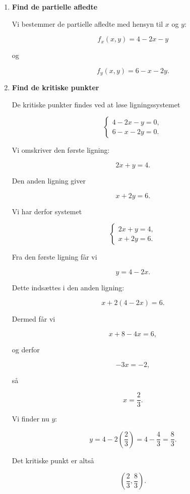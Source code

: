 \documentclass{article}
\begin{document}
\begin{enumerate}

    \item \textbf{Find de partielle afledte}

    Vi bestemmer de partielle afledte med hensyn til $x$ og $y$:

    \[
    f_x(x,y)=4-2x-y
    \]

    og

    \[
    f_y(x,y)=6-x-2y.
    \]

    \item \textbf{Find de kritiske punkter}

    De kritiske punkter findes ved at løse ligningssystemet

    \[
    \begin{cases}
    4-2x-y=0,\\
    6-x-2y=0.
    \end{cases}
    \]

    Vi omskriver den første ligning:

    \[
    2x+y=4.
    \]

    Den anden ligning giver

    \[
    x+2y=6.
    \]

    Vi har derfor systemet

    \[
    \begin{cases}
    2x+y=4,\\
    x+2y=6.
    \end{cases}
    \]

    Fra den første ligning får vi

    \[
    y=4-2x.
    \]

    Dette indsættes i den anden ligning:

    \[
    x+2(4-2x)=6.
    \]

    Dermed får vi

    \[
    x+8-4x=6,
    \]

    og derfor

    \[
    -3x=-2,
    \]

    så

    \[
    x=\frac{2}{3}.
    \]

    Vi finder nu $y$:

    \[
    y=4-2\left(\frac{2}{3}\right)
    =4-\frac{4}{3}
    =\frac{8}{3}.
    \]

    Det kritiske punkt er altså

    \[
    \boxed{\left(\frac{2}{3},\frac{8}{3}\right)}.
    \]


\end{enumerate}
\end{document}
